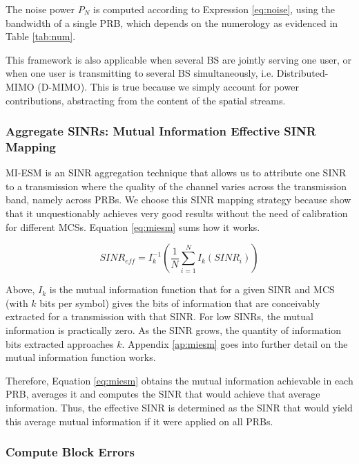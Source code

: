 The noise power $P_N$ is computed according to Expression \ref{eq:noise}, using the bandwidth of a single PRB, which depends on the numerology as evidenced in Table \ref{tab:num}.

This framework is also applicable when several BS are jointly serving one user, or when one user is transmitting to several BS simultaneously, i.e. Distributed-MIMO (D-MIMO). This is true because we simply account for power contributions, abstracting from the content of the spatial streams.



\subsubsection*{Aggregate SINRs: Mutual Information Effective SINR Mapping}
\label{sec:miesm}

\acs{MI-ESM} is an SINR aggregation technique that allows us to attribute one SINR to a transmission where the quality of the channel varies across the transmission band, namely across PRBs. We choose this SINR mapping strategy because \cite{1656798, 4657235, 5982870, 6008103, miesm1} show that it unquestionably achieves very good results without the need of calibration for different MCSs. Equation \eqref{eq:miesm} sums how it works.

\begin{equation} \label{eq:miesm}
    SINR_{eff} = I_k^{-1} \left( \frac{1}{N} \sum_{i=1}^N I_k\left(SINR_i\right)\right)
\end{equation}

Above, $I_k$ is the mutual information function that for a given SINR and MCS (with $k$ bits per symbol) gives the bits of information that are conceivably extracted for a transmission with that SINR. For low SINRs, the mutual information is practically zero. As the SINR grows, the quantity of information bits extracted approaches $k$. Appendix \ref{ap:miesm} goes into further detail on the mutual information function works.  

Therefore, Equation \eqref{eq:miesm} obtains the mutual information achievable in each PRB, averages it and computes the SINR that would achieve that average information. Thus, the effective SINR is determined as the SINR that would yield this average mutual information if it were applied on all PRBs. 

\subsubsection*{Compute Block Errors}


